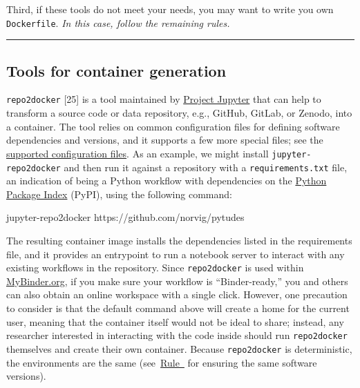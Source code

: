 \documentclass[10pt,letterpaper]{article}
\newenvironment{Shaded}{\begin{snugshade}}{\end{snugshade}}
\newcommand{\ExtensionTok}[1]{#1}
\newcommand{\NormalTok}[1]{#1}
\begin{document}
Third, if these tools do not meet your needs, you may want to write you
own \texttt{Dockerfile}. \emph{In this case, follow the remaining
rules.}

\begin{center}\rule{0.5\linewidth}{0.5pt}\end{center}

\hypertarget{tools-for-container-generation}{%
\subsection{Tools for container
generation}\label{tools-for-container-generation}}

\texttt{repo2docker} {[}25{]} is a tool maintained by
\href{https://jupyter.org/}{Project Jupyter} that can help to transform
a source code or data repository, e.g., GitHub, GitLab, or Zenodo, into
a container. The tool relies on common configuration files for defining
software dependencies and versions, and it supports a few more special
files; see the
\href{https://repo2docker.readthedocs.io/en/latest/config_files.html}{supported
configuration files}. As an example, we might install
\texttt{jupyter-repo2docker} and then run it against a repository with a
\texttt{requirements.txt} file, an indication of being a Python workflow
with dependencies on the \href{https://pypi.org/}{Python Package Index}
(PyPI), using the following command:

\footnotesize

\begin{Shaded}
\begin{Highlighting}[]
\ExtensionTok{jupyter-repo2docker}\NormalTok{ https://github.com/norvig/pytudes}
\end{Highlighting}
\end{Shaded}

\normalsize

The resulting container image installs the dependencies listed in the
requirements file, and it provides an entrypoint to run a notebook
server to interact with any existing workflows in the repository. Since
\texttt{repo2docker} is used within
\href{https://mybinder.org/}{MyBinder.org}, if you make sure your
workflow is ``Binder-ready,'' you and others can also obtain an online
workspace with a single click. However, one precaution to consider is
that the default command above will create a home for the current user,
meaning that the container itself would not be ideal to share; instead,
any researcher interested in interacting with the code inside should run
\texttt{repo2docker} themselves and create their own container. Because
\texttt{repo2docker} is deterministic, the environments are the same
(see~\hyperref[{rule:pinning}]{Rule~} for
ensuring the same software versions).
\end{document}
